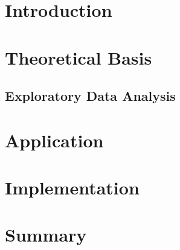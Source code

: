 \documentclass[a4paper, 12pt, oneside]{scrbook}
\begin{document}
	\frontmatter
	
	
	\tableofcontents
	\listoffigures
	\nocite{*}

	\mainmatter

	\pagebreak
	\chapter{Introduction} 
	
	\chapter{Theoretical Basis}
	
	\section{Exploratory Data Analysis} 
	
	\chapter{Application}
	
	
	\chapter{Implementation}
	
	
	\chapter{Summary} %
	
	\frontmatter
	\printbibliography
\end{document}
